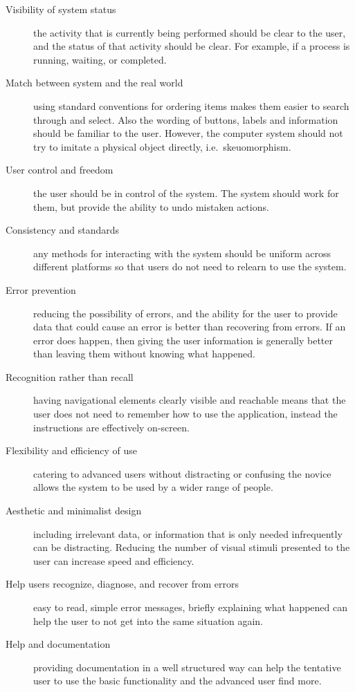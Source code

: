 \begin{description}

	\item[Visibility of system status] the activity that is currently being
		performed should be clear to the user, and the status of that activity
		should be clear. For example, if a process is running, waiting, or
		completed.

	\item[Match between system and the real world] using standard conventions
		for ordering items makes them easier to search through and select. Also
		the wording of buttons, labels and information should be familiar to
		the user. However, the computer system should not try to imitate a
		physical object directly, i.e.\ skeuomorphism.

	\item[User control and freedom] the user should be in control of the
		system. The system should work for them, but provide the ability to
		undo mistaken actions.

	\item[Consistency and standards] any methods for interacting with the
		system should be uniform across different platforms so that users do
		not need to relearn to use the system.

	\item[Error prevention] reducing the possibility of errors, and the ability
		for the user to provide data that could cause an error is better than
		recovering from errors. If an error does happen, then giving the user
		information is generally better than leaving them without knowing what
		happened.

	\item[Recognition rather than recall] having navigational elements clearly
		visible and reachable means that the user does not need to remember how
		to use the application, instead the instructions are effectively
		on-screen.

	\item[Flexibility and efficiency of use] catering to advanced users without
		distracting or confusing the novice allows the system to be used by a
		wider range of people.

	\item[Aesthetic and minimalist design] including irrelevant data, or
		information that is only needed infrequently can be distracting.
		Reducing the number of visual stimuli presented to the user can
		increase speed and efficiency.

	\item[Help users recognize, diagnose, and recover from errors] easy to
		read, simple error messages, briefly explaining what happened can help
		the user to not get into the same situation again.

	\item[Help and documentation] providing documentation in a well structured
		way can help the tentative user to use the basic functionality and the
		advanced user find more.

\end{description}
